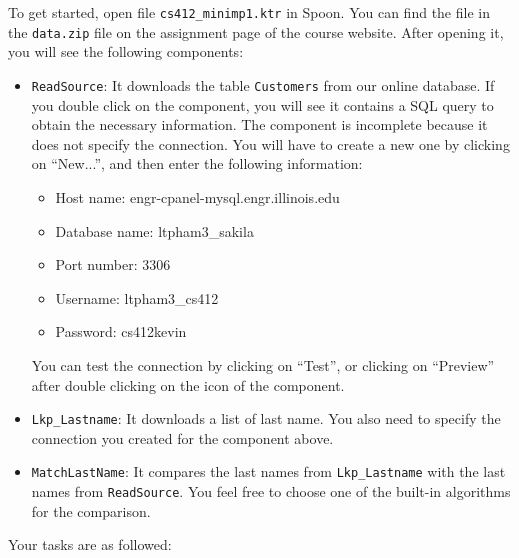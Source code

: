 To get started, open file \texttt{cs412\_minimp1.ktr} in Spoon. You can find the file in the \texttt{data.zip} file on the assignment page of the course website. After opening it, you will see the following components:
\begin{itemize}
\item \texttt{ReadSource}: It downloads the table \texttt{Customers} from our online database. If you double click on the component, you will see it contains a SQL query to obtain the necessary information. The component is incomplete because it does not specify the connection. You will have to create a new one by clicking on ``New...'', and then enter the following information: 
\begin{itemize}
\item Host name: engr-cpanel-mysql.engr.illinois.edu
\item Database name: ltpham3\_sakila
\item Port number: 3306
\item Username: ltpham3\_cs412
\item Password: cs412kevin
\end{itemize}
You can test the connection by clicking on ``Test'', or clicking on ``Preview'' after double clicking on the icon of the component.
\item \texttt{Lkp\_Lastname}: It downloads a list of last name. You also need to specify the connection you created for the component above.
\item \texttt{MatchLastName}: It compares the last names from \texttt{Lkp\_Lastname} with the last names from \texttt{ReadSource}. You feel free to choose one of the built-in algorithms for the comparison. 
\end{itemize}

Your tasks are as followed:

